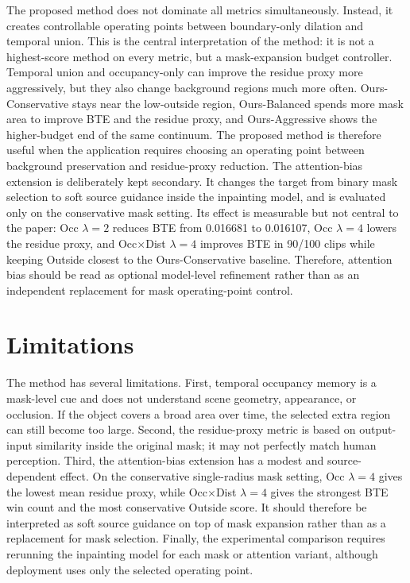 \documentclass[nouppercase]{kaia}
\begin{document}
The proposed method does not dominate all metrics simultaneously. Instead, it creates controllable operating points between boundary-only dilation and temporal union. This is the central interpretation of the method: it is not a highest-score method on every metric, but a mask-expansion budget controller. Temporal union and occupancy-only can improve the residue proxy more aggressively, but they also change background regions much more often. Ours-Conservative stays near the low-outside region, Ours-Balanced spends more mask area to improve BTE and the residue proxy, and Ours-Aggressive shows the higher-budget end of the same continuum. The proposed method is therefore useful when the application requires choosing an operating point between background preservation and residue-proxy reduction.
The attention-bias extension is deliberately kept secondary. It changes the target from binary mask selection to soft source guidance inside the inpainting model, and is evaluated only on the conservative mask setting. Its effect is measurable but not central to the paper: Occ $\lambda=2$ reduces BTE from 0.016681 to 0.016107, Occ $\lambda=4$ lowers the residue proxy, and Occ$\times$Dist $\lambda=4$ improves BTE in 90/100 clips while keeping Outside closest to the Ours-Conservative baseline. Therefore, attention bias should be read as optional model-level refinement rather than as an independent replacement for mask operating-point control.

\section{Limitations}
The method has several limitations. First, temporal occupancy memory is a mask-level cue and does not understand scene geometry, appearance, or occlusion. If the object covers a broad area over time, the selected extra region can still become too large. Second, the residue-proxy metric is based on output-input similarity inside the original mask; it may not perfectly match human perception. Third, the attention-bias extension has a modest and source-dependent effect. On the conservative single-radius mask setting, Occ $\lambda=4$ gives the lowest mean residue proxy, while Occ$\times$Dist $\lambda=4$ gives the strongest BTE win count and the most conservative Outside score. It should therefore be interpreted as soft source guidance on top of mask expansion rather than as a replacement for mask selection. Finally, the experimental comparison requires rerunning the inpainting model for each mask or attention variant, although deployment uses only the selected operating point.
\end{document}

